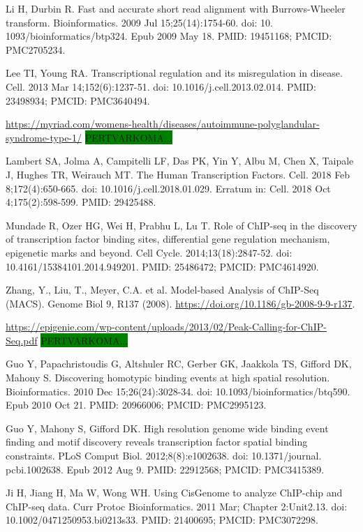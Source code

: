 \documentclass[12pt]{article}
\begin{document}
\begin{thebibliography}{99}
 Li H, Durbin R. Fast and accurate short read alignment with
Burrows-Wheeler transform. Bioinformatics. 2009 Jul 15;25(14):1754-60. doi: 10.
1093/bioinformatics/btp324. Epub 2009 May 18. PMID: 19451168; PMCID: PMC2705234.

 Lee TI, Young RA. Transcriptional regulation and its
misregulation in disease. Cell. 2013 Mar 14;152(6):1237-51.
doi: 10.1016/j.cell.2013.02.014. PMID: 23498934; PMCID: PMC3640494.

 \url{https://myriad.com/womens-health/diseases/autoimmune-polyglandular-syndrome-type-1/}
\colorbox{green}{PERTVARKOMA...}

 Lambert SA, Jolma A, Campitelli LF, Das PK, Yin Y, Albu M,
Chen X, Taipale J, Hughes TR, Weirauch MT. The Human Transcription Factors.
Cell. 2018 Feb 8;172(4):650-665. doi: 10.1016/j.cell.2018.01.029.
Erratum in: Cell. 2018 Oct 4;175(2):598-599. PMID: 29425488.

 Mundade R, Ozer HG, Wei H, Prabhu L, Lu T. Role of ChIP-seq
in the discovery of transcription factor binding sites, differential gene
regulation mechanism, epigenetic marks and beyond. Cell Cycle.
2014;13(18):2847-52. doi: 10.4161/15384101.2014.949201. PMID: 25486472;
PMCID: PMC4614920.

 Zhang, Y., Liu, T., Meyer, C.A. et al. Model-based Analysis
of ChIP-Seq (MACS). Genome Biol 9, R137 (2008).
\url{https://doi.org/10.1186/gb-2008-9-9-r137}.

 \url{https://epigenie.com/wp-content/uploads/2013/02/Peak-Calling-for-ChIP-Seq.pdf}
\colorbox{green}{PERTVARKOMA...}

 Guo Y, Papachristoudis G, Altshuler RC, Gerber GK, Jaakkola
TS, Gifford DK, Mahony S. Discovering homotypic binding events at high spatial
resolution. Bioinformatics. 2010 Dec 15;26(24):3028-34.
doi: 10.1093/bioinformatics/btq590. Epub 2010 Oct 21. PMID: 20966006;
PMCID: PMC2995123.

 Guo Y, Mahony S, Gifford DK. High resolution genome wide
binding event finding and motif discovery reveals transcription factor spatial
binding constraints. PLoS Comput Biol. 2012;8(8):e1002638. doi: 10.1371/journal.
pcbi.1002638. Epub 2012 Aug 9. PMID: 22912568; PMCID: PMC3415389.

 Ji H, Jiang H, Ma W, Wong WH. Using CisGenome to analyze
ChIP-chip and ChIP-seq data. Curr Protoc Bioinformatics. 2011 Mar;
Chapter 2:Unit2.13. doi: 10.1002/0471250953.bi0213s33. PMID: 21400695;
PMCID: PMC3072298.


\end{thebibliography}
\end{document}
